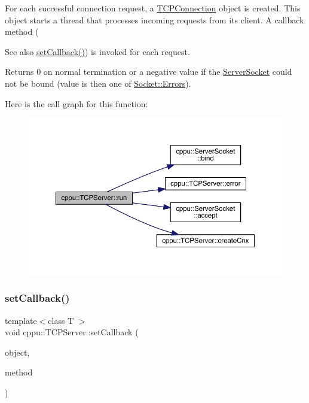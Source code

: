 For each successful connection request, a \mbox{\hyperlink{classcppu_1_1_t_c_p_connection}{T\+C\+P\+Connection}} object is created. This object starts a thread that processes incoming requests from its client. A callback method (\begin{DoxySeeAlso}{See also}
\mbox{\hyperlink{classcppu_1_1_t_c_p_server_a7d4fdb93439015934004755fde72945b}{set\+Callback()}}) is invoked for each request.
\end{DoxySeeAlso}
\begin{DoxyReturn}{Returns}
0 on normal termination or a negative value if the \mbox{\hyperlink{classcppu_1_1_server_socket}{Server\+Socket}} could not be bound (value is then one of \mbox{\hyperlink{classcppu_1_1_socket_a49ea5cb079bd7ae97ecf7eb30c9d9e5f}{Socket\+::\+Errors}}). 
\end{DoxyReturn}
Here is the call graph for this function\+:
\nopagebreak
\begin{figure}[H]
\begin{center}
\leavevmode
\includegraphics[width=350pt]{classcppu_1_1_t_c_p_server_a98e00d62745812b17bdee9f07f2070c4_cgraph}
\end{center}
\end{figure}
\mbox{\label{classcppu_1_1_t_c_p_server_a7d4fdb93439015934004755fde72945b}} 
\subsubsection{\texorpdfstring{setCallback()}{setCallback()}\hspace{0.1cm}{\footnotesize\ttfamily [1/2]}}
{\footnotesize\ttfamily template$<$class T $>$ \\
void cppu\+::\+T\+C\+P\+Server\+::set\+Callback (\begin{DoxyParamCaption}\item[{T \&}]{object,  }\item[{bool(T\+::$\ast$)(\mbox{\hyperlink{classcppu_1_1_t_c_p_connection}{T\+C\+P\+Connection}} \&cnx, const std\+::string \&request, std\+::string \&response)}]{method }\end{DoxyParamCaption})\hspace{0.3cm}{\ttfamily [inline]}}



